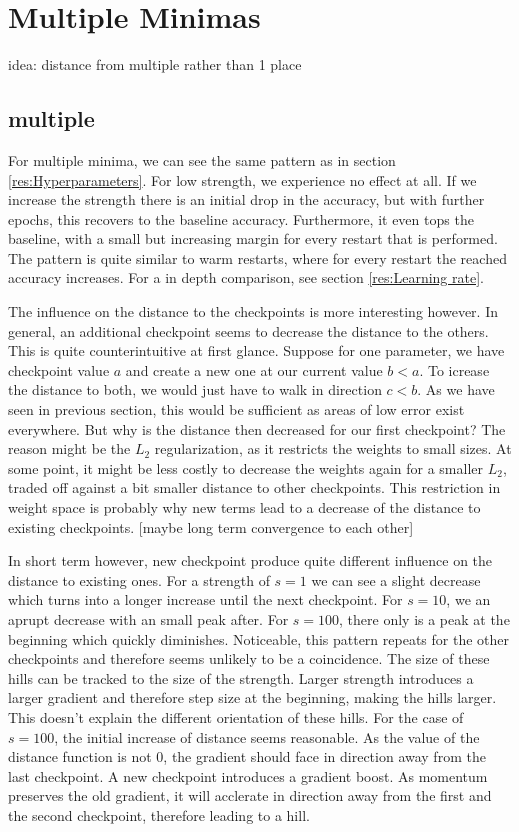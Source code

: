 \section{Multiple Minimas}\label{res:Multiple}
idea: distance from multiple rather than 1 place
\subsection{multiple}
For multiple minima, we can see the same pattern as in section
\ref{res:Hyperparameters}. For low strength, we experience no effect at all. If
we increase the strength there is an initial drop in the accuracy, but with
further epochs, this recovers to the baseline accuracy. Furthermore, it even
tops the baseline, with a small but increasing margin for every restart that is
performed. The pattern is quite similar to warm restarts, where for every
restart the reached accuracy increases. For a in depth comparison, see section
\ref{res:Learning rate}.

The influence on the distance to the checkpoints is more interesting however. In
general, an additional checkpoint seems to decrease the distance to the others.
This is quite counterintuitive at first glance. Suppose for one parameter, we
have checkpoint value $a$ and create a new one at our current value $b<a$. To
icrease the distance to both, we would just have to walk in direction $c<b$. As
we have seen in previous section, this would be sufficient as areas of low error
exist everywhere. But why is the distance then decreased for our first
checkpoint? The reason might be the $L_2$ regularization, as it restricts the
weights to small sizes. At some point, it might be less costly to decrease the
weights again for a smaller $L_2$, traded off against a bit smaller distance to
other checkpoints. This restriction in weight space is probably why new terms
lead to a decrease of the distance to existing checkpoints.
[maybe long term convergence to each other]

In short term however, new checkpoint produce quite different influence on the
distance to existing ones. For a strength of $s=1$ we can see a slight decrease
which turns into a longer increase until the next checkpoint. For $s=10$, we an
aprupt decrease with an small peak after. For $s=100$, there only is a peak at
the beginning which quickly diminishes. Noticeable, this pattern repeats for the
other checkpoints and therefore seems unlikely to be a coincidence. The size of
these hills can be tracked to the size of the strength. Larger strength
introduces a larger gradient and therefore step size at the beginning, making
the hills larger. This doesn't explain the different orientation of these hills.
For the case of $s=100$, the initial increase of distance seems reasonable. As
the value of the distance function is not 0, the gradient should face in
direction away from the last checkpoint. A new checkpoint introduces a gradient
boost. As momentum preserves the old gradient, it will acclerate in direction
away from the first and the second checkpoint, therefore leading to a hill.

